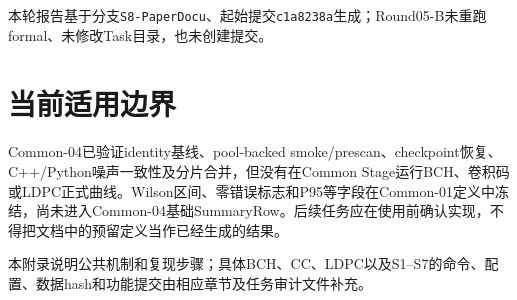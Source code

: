 本轮报告基于分支\texttt{S8-PaperDocu}、起始提交\texttt{c1a8238a}生成；Round05-B未重跑formal、未修改Task目录，也未创建提交。

\endgroup

\section{当前适用边界}

Common-04已验证identity基线、pool-backed smoke/prescan、checkpoint恢复、C++/Python噪声一致性及分片合并，但没有在Common Stage运行BCH、卷积码或LDPC正式曲线。Wilson区间、零错误标志和P95等字段在Common-01定义中冻结，尚未进入Common-04基础SummaryRow。后续任务应在使用前确认实现，不得把文档中的预留定义当作已经生成的结果。

本附录说明公共机制和复现步骤；具体BCH、CC、LDPC以及S1--S7的命令、配置、数据hash和功能提交由相应章节及任务审计文件补充。
